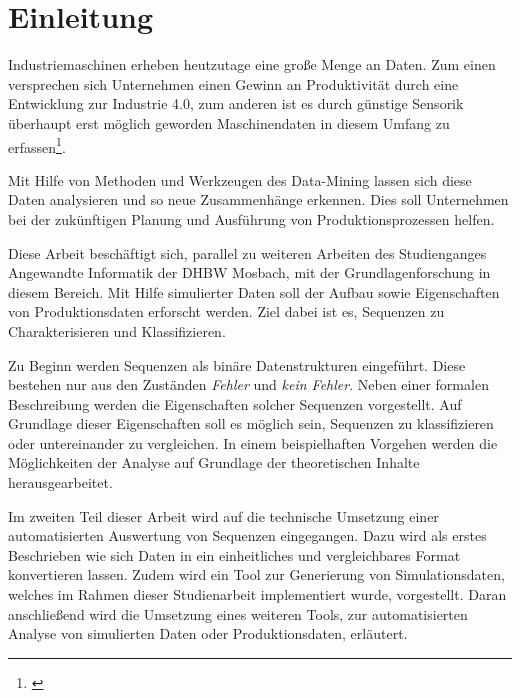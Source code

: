 \chapter{Einleitung}
\label{chp:introduction}
Industriemaschinen erheben heutzutage eine große Menge an Daten. Zum einen versprechen sich Unternehmen einen Gewinn an Produktivität durch eine Entwicklung zur Industrie 4.0, zum anderen ist es durch günstige Sensorik überhaupt erst möglich geworden Maschinendaten in diesem Umfang zu erfassen\footnote{ \cite{SmartFactory}}.

Mit Hilfe von Methoden und Werkzeugen des Data-Mining lassen sich diese Daten analysieren und so neue Zusammenhänge erkennen. Dies soll Unternehmen bei der zukünftigen Planung und Ausführung von Produktionsprozessen helfen.

Diese Arbeit beschäftigt sich, parallel zu weiteren Arbeiten des Studienganges Angewandte Informatik der DHBW Mosbach, mit der Grundlagenforschung in diesem Bereich. Mit Hilfe simulierter Daten soll der Aufbau sowie Eigenschaften von Produktionsdaten erforscht werden. Ziel dabei ist es, Sequenzen zu Charakterisieren und Klassifizieren.

Zu Beginn werden Sequenzen als binäre Datenstrukturen eingeführt. Diese bestehen nur aus den Zuständen \textit{Fehler} und \textit{kein Fehler}. Neben einer formalen Beschreibung werden die Eigenschaften solcher Sequenzen vorgestellt. Auf Grundlage dieser Eigenschaften soll es möglich sein, Sequenzen zu klassifizieren oder untereinander zu vergleichen. In einem beispielhaften Vorgehen werden die Möglichkeiten der Analyse auf Grundlage der theoretischen Inhalte herausgearbeitet.

Im zweiten Teil dieser Arbeit wird auf die technische Umsetzung einer automatisierten Auswertung von Sequenzen eingegangen. Dazu wird als erstes Beschrieben wie sich Daten in ein einheitliches und vergleichbares Format konvertieren lassen. Zudem wird ein Tool zur Generierung von Simulationsdaten, welches im Rahmen dieser Studienarbeit implementiert wurde, vorgestellt. Daran anschließend wird die Umsetzung eines weiteren Tools, zur automatisierten Analyse von simulierten Daten oder Produktionsdaten, erläutert. 